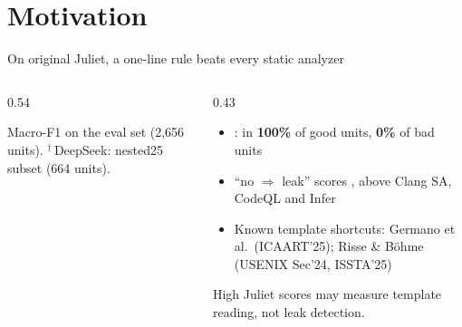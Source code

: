 \section{Motivation}

\begin{frame}{On original Juliet, a one-line rule beats every static analyzer}
  \begin{columns}[T]
    \begin{column}{0.54\textwidth}
      {\footnotesize\renewcommand{\arraystretch}{0.86}}\\[1pt]
      {\tiny Macro-F1 on the eval set (2,656 units). $^\dagger$\,DeepSeek: nested25 subset (664 units).\par}
    \end{column}
    \begin{column}{0.43\textwidth}
      \begin{itemize}\small
        \item {}: in \textbf{100\%} of good units, \textbf{0\%} of bad units
        \item ``no  $\Rightarrow$ leak'' scores \alert{}, above
              Clang SA, CodeQL and Infer
        \item Known template shortcuts: Germano et al.\ (ICAART'25); Risse \& B\"ohme (USENIX Sec'24, ISSTA'25)
      \end{itemize}
      \vspace{6pt}
      High Juliet scores may measure \alert{template reading}, not leak detection.
    \end{column}
  \end{columns}
\end{frame}

